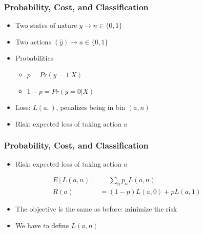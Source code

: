 \documentclass[
  shownotes,
  xcolor={svgnames},
  hyperref={colorlinks,citecolor=DarkBlue,linkcolor=DarkRed,urlcolor=DarkBlue}
  , aspectratio=169]{beamer}
\begin{document}
\begin{frame}[fragile]
\frametitle{Probability, Cost, and Classification}

\begin{itemize}
  \item Two states of nature $y \rightarrow n\in\{0,1\}$
  \medskip
  \item Two actions $(\hat{y}) \rightarrow a\in \{0,1\}$
  \medskip
  \item Probabilities
  \begin{itemize}
    \item $p=Pr(y=1|X)$
    \item $1-p=Pr(y=0|X)$
  \end{itemize}
  \medskip
  \item Loss: $L(a,)$, penalizes being in bin $(a,n)$
  \item Risk: expected loss of taking action $a$
\end{itemize}


\end{frame}
\begin{frame}[fragile]
\frametitle{Probability, Cost, and Classification}

\begin{itemize}
  \item Risk: expected loss of taking action $a$
\end{itemize}

\begin{align}
E[L(a,n)] &= \sum_n p_n L(a,n) \\ \nonumber
R(a) &= (1-p) L(a,0) + p L(a,1)
\end{align}

\begin{itemize}
  \item The objective is the same as before: minimize the risk
  \item We have to define $L(a,n)$
\end{itemize}

\end{frame}
\end{document}
